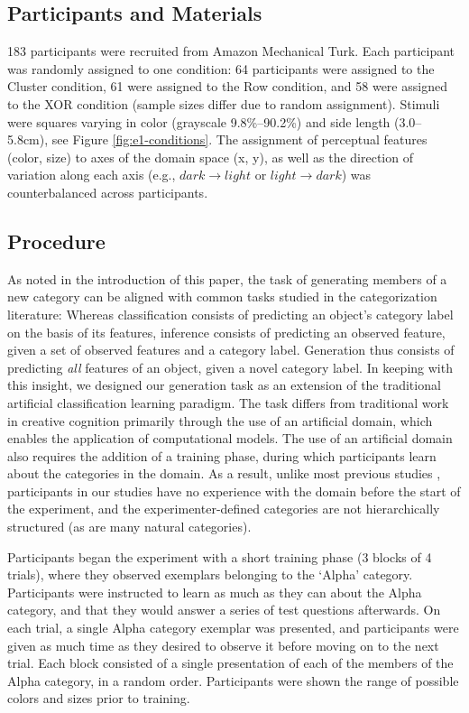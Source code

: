 \documentclass[12pt]{article}
\begin{document}
\begin{flushleft}
\subsection{Participants and Materials}

183 participants were recruited from Amazon Mechanical Turk. Each participant was randomly assigned to one condition: 64 participants were assigned to the Cluster condition, 61 were assigned to the Row condition, and 58 were assigned to the XOR condition (sample sizes differ due to random assignment). Stimuli were squares varying in color (grayscale 9.8\%--90.2\%) and side length (3.0--5.8cm), see Figure \ref{fig:e1-conditions}. The assignment of perceptual features (color, size) to axes of the domain space (x, y), as well as the direction of variation along each axis (e.g., $dark \rightarrow light$ or $light \rightarrow dark$) was counterbalanced across participants.

\subsection{Procedure}

As noted in the introduction of this paper, the task of generating members of a new category can be aligned with common tasks studied in the categorization literature: Whereas classification consists of predicting an object's category label on the basis of its features, inference consists of predicting an observed feature, given a set of observed features and a category label. Generation thus consists of predicting {\em all} features of an object, given a novel category label. In keeping with this insight, we designed our generation task as an extension of the traditional artificial classification learning paradigm. The task differs from traditional work in creative cognition primarily through the use of an artificial domain, which enables the application of computational models. The use of an artificial domain also requires the addition of a training phase, during which participants learn about the categories in the domain. As a result, unlike most previous studies \citep[e.g.,][]{ward1994structured}, participants in our studies have no experience with the domain before the start of the experiment, and the experimenter-defined categories are not hierarchically structured (as are many natural categories).

Participants began the experiment with a short training phase (3 blocks of 4 trials), where they observed exemplars belonging to the `Alpha' category. Participants were instructed to learn as much as they can about the Alpha category, and that they would answer a series of test questions afterwards. On each trial, a single Alpha category exemplar was presented, and participants were given as much time as they desired to observe it before moving on to the next trial. Each block consisted of a single presentation of each of the members of the Alpha category, in a random order. Participants were shown the range of possible colors and sizes prior to training.


\end{flushleft}
\end{document}
